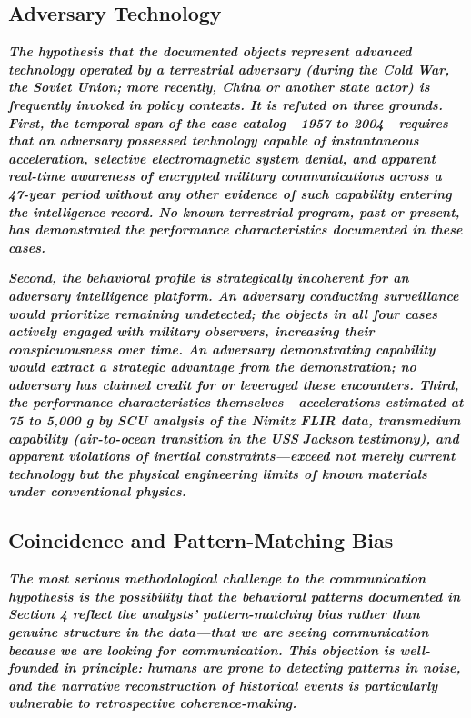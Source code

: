 \documentclass[11pt,letterpaper]{article}
\begin{document}
\subsection{Adversary Technology}

\textbf{\textit{The hypothesis that the documented objects represent advanced technology operated by a terrestrial adversary (during the Cold War, the Soviet Union; more recently, China or another state actor) is frequently invoked in policy contexts. It is refuted on three grounds. First, the temporal span of the case catalog---1957 to 2004---requires that an adversary possessed technology capable of instantaneous acceleration, selective electromagnetic system denial, and apparent real-time awareness of encrypted military communications across a 47-year period without any other evidence of such capability entering the intelligence record. No known terrestrial program, past or present, has demonstrated the performance characteristics documented in these cases.}}


\textbf{\textit{Second, the behavioral profile is strategically incoherent for an adversary intelligence platform. An adversary conducting surveillance would prioritize remaining undetected; the objects in all four cases actively engaged with military observers, increasing their conspicuousness over time. An adversary demonstrating capability would extract a strategic advantage from the demonstration; no adversary has claimed credit for or leveraged these encounters. Third, the performance characteristics themselves---accelerations estimated at 75 to 5,000 g by SCU analysis of the Nimitz FLIR data, transmedium capability (air-to-ocean transition in the USS }}\textbf{\textit{Jackson}}\textbf{\textit{ testimony), and apparent violations of inertial constraints---exceed not merely current technology but the physical engineering limits of known materials under conventional physics.}}


\subsection{Coincidence and Pattern-Matching Bias}

\textbf{\textit{The most serious methodological challenge to the communication hypothesis is the possibility that the behavioral patterns documented in Section 4 reflect the analysts' pattern-matching bias rather than genuine structure in the data---that we are seeing communication because we are looking for communication. This objection is well-founded in principle: humans are prone to detecting patterns in noise, and the narrative reconstruction of historical events is particularly vulnerable to retrospective coherence-making.}}
\end{document}
